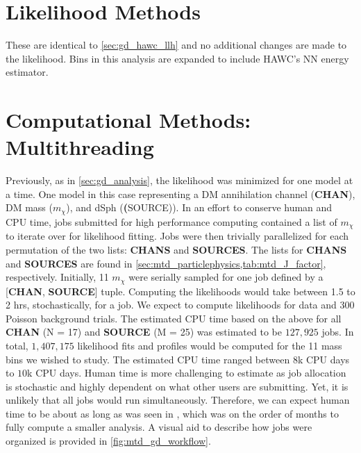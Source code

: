 \section{Likelihood Methods} \label{sec:mtd_ll_methods}

These are identical to \cref{sec:gd_hawc_llh} and no additional changes are made to the likelihood.
Bins in this analysis are expanded to include HAWC's NN energy estimator.

\section{Computational Methods: Multithreading} \label{sec:mtd_comp_methods}

Previously, as in \cref{sec:gd_analysis}, the likelihood was minimized for one model at a time.
One model in this case representing a DM annihilation channel (\textbf{CHAN}), DM mass ($m_\chi$), and dSph (\textbf(SOURCE)).
In an effort to conserve human and CPU time, jobs submitted for high performance computing contained a list of $m_\chi$ to iterate over for likelihood fitting.
Jobs were then trivially parallelized for each permutation of the two lists: \textbf{CHANS} and \textbf{SOURCES}.
The lists for \textbf{CHANS} and \textbf{SOURCES} are found in \cref{sec:mtd_particlephysics,tab:mtd_J_factor}, respectively.
Initially, 11 $m_\chi$ were serially sampled for one job defined by a [\textbf{CHAN}, \textbf{SOURCE}] tuple.
Computing the likelihoods would take between 1.5 to 2 hrs, stochastically, for a job.
We expect to compute likelihoods for data and 300 Poisson background trials.
The estimated CPU time based on the above for all \textbf{CHAN} (N = 17) and \textbf{SOURCE} (M = 25) was estimated to be $127,925$ jobs.
In total, $1,407,175$ likelihood fits and profiles would be computed for the 11 mass bins we wished to study.
The estimated CPU time ranged between $8$k CPU days to $10$k CPU days.
Human time is more challenging to estimate as job allocation is stochastic and highly dependent on what other users are submitting.
Yet, it is unlikely that all jobs would run simultaneously.
Therefore, we can expect human time to be about as long as was seen in , which was on the order of months to fully compute a smaller analysis.
A visual aid to describe how jobs were organized is provided in \cref{fig:mtd_gd_workflow}.

